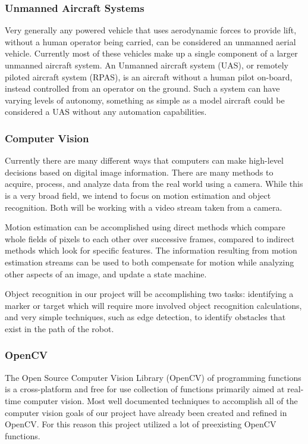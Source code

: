 \documentclass{article}
\begin{document}
		\subsubsection{Unmanned Aircraft Systems}
		
		Very generally any powered vehicle that uses aerodynamic forces to provide lift, without a human operator being carried, can be considered an unmanned aerial vehicle. Currently most of these vehicles make up a single component of a larger unmanned aircraft system. An Unmanned aircraft system (UAS), or remotely piloted aircraft system (RPAS), is an aircraft without a human pilot on-board, instead controlled from an operator on the ground. Such a system can have varying levels of autonomy, something as simple as a model aircraft could be considered a UAS without any automation capabilities. 
		
		\subsubsection{Computer Vision}
		
		Currently there are many different ways that computers can make high-level decisions based on digital image information. There are many methods to acquire, process, and analyze data from the real world using a camera. While this is a very broad field, we intend to focus on motion estimation and object recognition. Both will be working with a video stream taken from a camera. 
		
		Motion estimation can be accomplished using direct methods which compare whole fields of pixels to each other over successive frames, compared to indirect methods which look for specific features. The information resulting from motion estimation streams can be used to both compensate for motion while analyzing other aspects of an image, and update a state machine.
		
		Object recognition in our project will be accomplishing two tasks: identifying a marker or target which will require more involved object recognition calculations, and very simple techniques, such as edge detection, to identify obstacles that exist in the path of the robot.
		
		\subsubsection{OpenCV}
		
		The Open Source Computer Vision Library (OpenCV) of programming functions is a cross-platform and free for use collection of functions primarily aimed at real-time computer vision\cite{opencv}. Most well documented techniques to accomplish all of the computer vision goals of our project have already been created and refined in OpenCV. For this reason this project utilized a lot of preexisting OpenCV functions.
		
\end{document}
